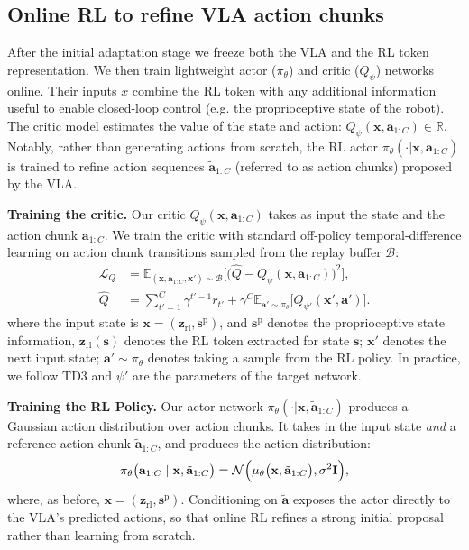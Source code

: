 \subsection{Online RL to refine VLA action chunks}
\label{sec:chunk_rl}


After the initial adaptation stage we freeze both the VLA and the RL token representation. We then train lightweight actor ($\pi_\theta$) and critic ($Q_{\psi}$) networks online. Their inputs $x$ combine the RL token with any additional information useful to enable closed-loop control (e.g. the proprioceptive state of the robot). The critic model estimates the value of the state and action: $Q_{\psi}(\mathbf{x},\mathbf{a}_{1:C})\in \mathbb{R}$. Notably, rather than generating actions from scratch, the RL actor $\pi_\theta(\cdot | \mathbf{x}, \tilde{\mathbf{a}}_{1:C})$ is trained to refine action sequences $\tilde{\mathbf{a}}_{1:C}$ (referred to as action chunks) proposed by the VLA. 

\textbf{Training the critic.}  Our critic $Q_\psi( \mathbf{x},\mathbf{a}_{1:C})$ takes as input the state and the action chunk $\mathbf{a}_{1:C}$. We train the critic with standard off-policy temporal-difference learning on action chunk transitions sampled from the replay buffer $\mathcal{B}$:
\begin{equation}
\begin{aligned}
\mathcal{L}_Q&=\mathbb{E}_{(\mathbf{x}, \mathbf{a}_{1:C}, \mathbf{x}') \sim \mathcal{B}}
\Big[\big(\hat{Q}-Q_\psi(\mathbf{x}, \mathbf{a}_{1:C})
\big)^2\Big], \\
\hat{Q}&=\sum_{t'=1}^{C} \gamma^{t'-1} r_{t'}+\gamma^C\mathbb{E}_{\mathbf{a}' \sim \pi_\theta}
\Big[Q_{\psi'}(\mathbf{x}', \mathbf{a}')\Big].
\end{aligned}
\label{eq:critic_loss}
\end{equation}
where the input state is $\mathbf{x} =(\mathbf{z}_\text{rl}, \mathbf{s}^\text{p})$, and $\mathbf{s}^\text{p}$ denotes the proprioceptive state information, $\mathbf{z}_\text{rl}(\mathbf{s})$ denotes the RL token extracted for state $\mathbf{s}$; $\mathbf{x}'$ denotes the next input state; $\mathbf{a}' \sim \pi_\theta$ denotes taking a sample from the RL policy.  In practice, we follow TD3 \citep{fujimoto2018td3} and $\psi'$ are the parameters of the target network.


\textbf{Training the RL Policy.}
Our actor network $\pi_\theta(\cdot| \mathbf{x},\tilde{\mathbf{a}}_{1:C})$ produces a Gaussian action distribution over action chunks. It takes in the input state  \emph{and} a reference action chunk $\tilde{\mathbf{a}}_{1:C}$, and produces the action distribution: 
\begin{equation}
\pi_\theta\bigl(\mathbf{a}_{1:C} \mid \mathbf{x}, \tilde{\mathbf{a}}_{1:C}\bigr)
  =
  \mathcal{N}\Bigl(
    \mu_\theta\bigl(\mathbf{x}, \tilde{\mathbf{a}}_{1:C} \bigr),
    \sigma^2 \mathbf{I}
  \Bigr),
  \label{eq:policy}
\end{equation}
where, as before, $\mathbf{x} =(\mathbf{z}_\text{rl}, \mathbf{s}^\text{p})$.
Conditioning on $\tilde{\mathbf{a}}$ exposes the actor directly to the VLA’s predicted actions, so that online RL refines a strong initial proposal rather than learning from scratch. 


